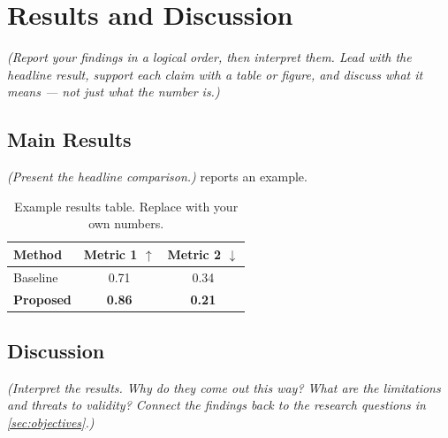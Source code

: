 \chapter{Results and Discussion}
\label{ch:results}

\emph{(Report your findings in a logical order, then interpret them. Lead with
the headline result, support each claim with a table or figure, and discuss what
it means --- not just what the number is.)}

\section{Main Results}
\label{sec:res-main}

\emph{(Present the headline comparison.)}  reports an example.

\begin{table}[ht]
  \centering
  \caption{Example results table. Replace with your own numbers.}
  \label{tab:results}
  \begin{tabular}{l c c}
    \toprule
    Method & Metric 1 $\uparrow$ & Metric 2 $\downarrow$ \\
    \midrule
    Baseline          & 0.71 & 0.34 \\
    \textbf{Proposed} & \textbf{0.86} & \textbf{0.21} \\
    \bottomrule
  \end{tabular}
\end{table}

\section{Discussion}
\label{sec:res-discussion}

\emph{(Interpret the results. Why do they come out this way? What are the
limitations and threats to validity? Connect the findings back to the research
questions in \cref{sec:objectives}.)}
